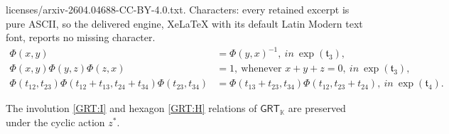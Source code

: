 \documentclass[10pt,a4paper]{amsart}
\newcommand{\GRT}{{\mathsf{GRT}}}
\newcommand{\ft}{\mathfrak{t}}
\newcommand{\kk}{\mathbb{K}}    %
\begin{document}
licenses/arxiv-2604.04688-CC-BY-4.0.txt. Characters: every retained excerpt is pure ASCII, so the delivered engine, XeLaTeX with its default Latin Modern text font, reports no missing character.
\begin{align}
    \Phi(x, y) &= \Phi(y, x)^{-1}, \ in \ \exp({\ft_3}) \tag{I}\label{GRT:I}, \\
    \Phi(x, y)\Phi(y, z)\Phi(z, x) &= 1, \ \text{whenever } x + y + z = 0, \ in \ \exp({\ft_3})  \tag{H} \label{GRT:H},\\
   \Phi(t_{12}, t_{23}) \Phi(t_{12}+t_{13}, t_{24}+t_{34})\Phi(t_{23}, t_{34}) &= \Phi(t_{13}+t_{23}, t_{34}) \Phi(t_{12}, t_{23}+t_{24}), \ in \ \exp({\ft_4})\tag{P}\label{GRT:P}.
\end{align}

\begin{prop}\label{prop: cyclic GRT on (H) and (I)}
The involution \eqref{GRT:I} and hexagon \eqref{GRT:H} relations of $\GRT_{\kk}$ are preserved under the cyclic action $z^*$.
\end{prop}
\end{document}
